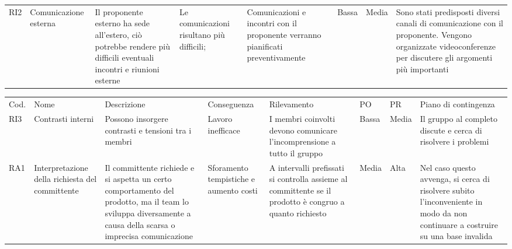 \begin{landscape}
\begin{table}[h]
\begin{center}
\begin{tabular}{p{0.6cm}|p{1.8cm}|p{4cm}|p{2cm}|p{4cm}|p{0.9cm}|p{0.8cm}|p{4cm}}
RI2 & Comunicazione esterna & Il proponente esterno ha sede all’estero, ciò potrebbe rendere più difficili eventuali incontri e riunioni esterne                                                     & Le comunicazioni risultano più difficili;                              & Comunicazioni e incontri con il proponente verranno pianificati preventivamente                                                     & Bassa & Media & Sono stati predisposti diversi canali di comunicazione con il proponente. Vengono organizzate videoconferenze per discutere gli argomenti più importanti \\
\end{tabular}
\end{center}
\end{table}
\begin{table}[h]
\begin{center}
\begin{tabular}{p{0.6cm}|p{1.8cm}|p{4cm}|p{2cm}|p{4cm}|p{0.9cm}|p{0.8cm}|p{4cm}}
Cod. & Nome                & Descrizione    & Conseguenza                  & Rilevamento                                                                                                                                                                    & PO & PR & Piano di contingenza                                                                                                                                                                                             \\
RI3 & Contrasti interni     & Possono insorgere contrasti e tensioni tra i membri                                                                                                                  & Lavoro inefficace                                                      & I membri coinvolti devono comunicare l’incomprensione a tutto il gruppo                                                            & Bassa & Media & Il gruppo al completo discute e cerca di risolvere i problemi  \\
RA1 & Interpretazione della richiesta del committente & Il committente richiede e si aspetta un certo comportamento del prodotto, ma il team lo sviluppa diversamente a causa della scarsa o imprecisa comunicazione & Sforamento tempistiche e aumento costi & A intervalli prefissati si controlla assieme al committente se il prodotto è congruo a quanto richiesto & Media & Alta & Nel caso questo avvenga, si cerca di risolvere subito l’inconveniente in modo da non continuare a costruire su una base invalida \\

\end{tabular}
\end{center}
\end{table}
\end{landscape}
